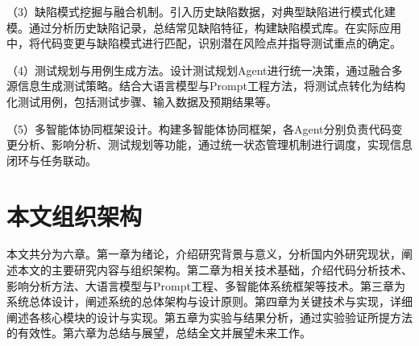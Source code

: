 （3）缺陷模式挖掘与融合机制。引入历史缺陷数据，对典型缺陷进行模式化建模。通过分析历史缺陷记录，总结常见缺陷特征，构建缺陷模式库。在实际应用中，将代码变更与缺陷模式进行匹配，识别潜在风险点并指导测试重点的确定。

（4）测试规划与用例生成方法。设计测试规划Agent进行统一决策，通过融合多源信息生成测试策略。结合大语言模型与Prompt工程方法，将测试点转化为结构化测试用例，包括测试步骤、输入数据及预期结果等\cite{Wang2021CodeT5}。

（5）多智能体协同框架设计。构建多智能体协同框架，各Agent分别负责代码变更分析、影响分析、测试规划等功能，通过统一状态管理机制进行调度，实现信息闭环与任务联动。

\section{本文组织架构}
本文共分为六章。第一章为绪论，介绍研究背景与意义，分析国内外研究现状，阐述本文的主要研究内容与组织架构。第二章为相关技术基础，介绍代码分析技术、影响分析方法、大语言模型与Prompt工程、多智能体系统框架等技术。第三章为系统总体设计，阐述系统的总体架构与设计原则。第四章为关键技术与实现，详细阐述各核心模块的设计与实现。第五章为实验与结果分析，通过实验验证所提方法的有效性。第六章为总结与展望，总结全文并展望未来工作。
